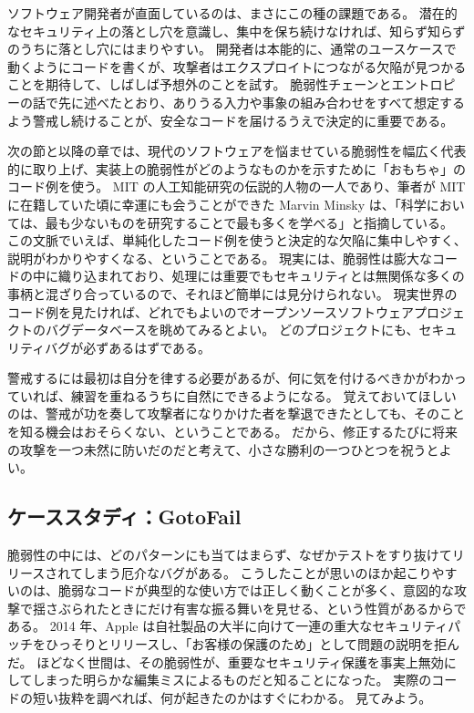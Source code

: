 \documentclass[uplatex]{jsarticle}
\begin{document}
ソフトウェア開発者が直面しているのは、まさにこの種の課題である。
潜在的なセキュリティ上の落とし穴を意識し、集中を保ち続けなければ、知らず知らずのうちに落とし穴にはまりやすい。
開発者は本能的に、通常のユースケースで動くようにコードを書くが、攻撃者はエクスプロイトにつながる欠陥が見つかることを期待して、しばしば予想外のことを試す。
脆弱性チェーンとエントロピーの話で先に述べたとおり、ありうる入力や事象の組み合わせをすべて想定するよう警戒し続けることが、安全なコードを届けるうえで決定的に重要である。

次の節と以降の章では、現代のソフトウェアを悩ませている脆弱性を幅広く代表的に取り上げ、実装上の脆弱性がどのようなものかを示すために「おもちゃ」のコード例を使う。
MIT の人工知能研究の伝説的人物の一人であり、筆者が MIT に在籍していた頃に幸運にも会うことができた Marvin Minsky は、「科学においては、最も少ないものを研究することで最も多くを学べる」と指摘している。
この文脈でいえば、単純化したコード例を使うと決定的な欠陥に集中しやすく、説明がわかりやすくなる、ということである。
現実には、脆弱性は膨大なコードの中に織り込まれており、処理には重要でもセキュリティとは無関係な多くの事柄と混ざり合っているので、それほど簡単には見分けられない。
現実世界のコード例を見たければ、どれでもよいのでオープンソースソフトウェアプロジェクトのバグデータベースを眺めてみるとよい。
どのプロジェクトにも、セキュリティバグが必ずあるはずである。

警戒するには最初は自分を律する必要があるが、何に気を付けるべきかがわかっていれば、練習を重ねるうちに自然にできるようになる。
覚えておいてほしいのは、警戒が功を奏して攻撃者になりかけた者を撃退できたとしても、そのことを知る機会はおそらくない、ということである。
だから、修正するたびに将来の攻撃を一つ未然に防いだのだと考えて、小さな勝利の一つひとつを祝うとよい。

\subsection{ケーススタディ：GotoFail}

脆弱性の中には、どのパターンにも当てはまらず、なぜかテストをすり抜けてリリースされてしまう厄介なバグがある。
こうしたことが思いのほか起こりやすいのは、脆弱なコードが典型的な使い方では正しく動くことが多く、意図的な攻撃で揺さぶられたときにだけ有害な振る舞いを見せる、という性質があるからである。
2014 年、Apple は自社製品の大半に向けて一連の重大なセキュリティパッチをひっそりとリリースし、「お客様の保護のため」として問題の説明を拒んだ。
ほどなく世間は、その脆弱性が、重要なセキュリティ保護を事実上無効にしてしまった明らかな編集ミスによるものだと知ることになった。
実際のコードの短い抜粋を調べれば、何が起きたのかはすぐにわかる。
見てみよう。
\end{document}
